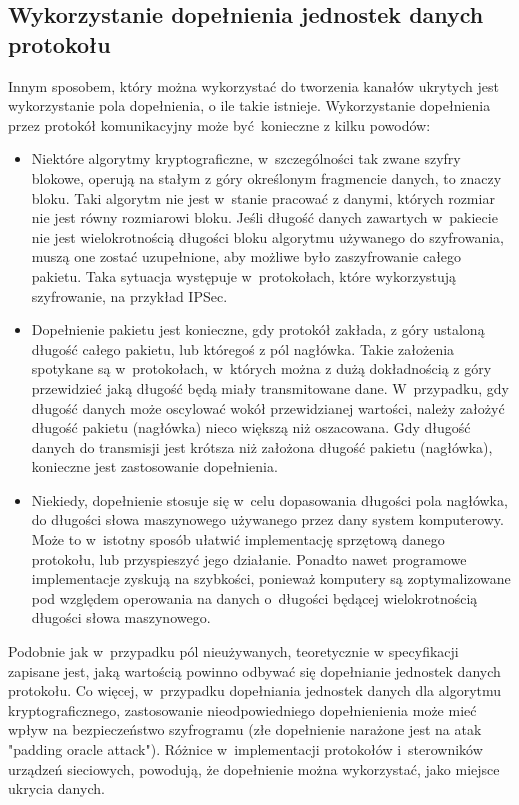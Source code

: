 \documentclass[a4paper, twoside, openright, 12pt]{report}
\begin{document}
        \subsection{Wykorzystanie dopełnienia jednostek danych protokołu}
        Innym sposobem, który można wykorzystać do tworzenia kanałów ukrytych
        jest wykorzystanie pola dopełnienia, o ile takie istnieje.
        Wykorzystanie dopełnienia przez protokół komunikacyjny
        może być konieczne z kilku powodów:
        \begin{itemize}
            \item Niektóre algorytmy kryptograficzne, w~szczególności
        tak zwane szyfry blokowe, operują na stałym z góry określonym fragmencie danych,
        to znaczy bloku. Taki algorytm nie jest w~stanie pracować z danymi, których
        rozmiar nie jest równy rozmiarowi bloku. Jeśli długość
        danych zawartych w~pakiecie nie jest wielokrotnością długości bloku
        algorytmu używanego do szyfrowania, muszą one zostać uzupełnione, aby możliwe
        było zaszyfrowanie całego pakietu. Taka sytuacja występuje w~protokołach,
        które wykorzystują szyfrowanie, na przykład IPSec\cite{IPSECPADDING}.
            \item Dopełnienie pakietu jest konieczne, gdy protokół zakłada, z góry ustaloną długość
        całego pakietu, lub któregoś z pól nagłówka. Takie założenia spotykane są
        w~protokołach, w~których można z dużą dokładnością z góry przewidzieć jaką długość
        będą miały transmitowane dane. W~przypadku, gdy długość danych może oscylować
        wokół przewidzianej wartości, należy założyć długość pakietu (nagłówka)
        nieco większą niż oszacowana. Gdy długość danych do transmisji jest krótsza niż
        założona długość pakietu (nagłówka), konieczne jest zastosowanie dopełnienia.
            \item Niekiedy, dopełnienie stosuje się w~celu dopasowania długości pola nagłówka,
        do długości słowa maszynowego używanego przez dany system komputerowy. Może
        to w~istotny sposób ułatwić implementację sprzętową danego protokołu, lub
        przyspieszyć jego działanie. Ponadto nawet programowe implementacje zyskują
        na szybkości, ponieważ komputery są zoptymalizowane pod względem operowania
        na danych o~długości będącej wielokrotnością długości słowa maszynowego.
        \end{itemize}

        Podobnie jak w~przypadku pól nieużywanych, teoretycznie w specyfikacji
        zapisane jest, jaką wartością powinno odbywać się dopełnianie jednostek danych protokołu.
        Co więcej,
        w~przypadku dopełniania jednostek danych dla algorytmu kryptograficznego, zastosowanie
        nieodpowiedniego dopełnienienia może mieć wpływ na bezpieczeństwo szyfrogramu (złe dopełnienie narażone
        jest na atak "padding oracle attack"). Różnice w~implementacji protokołów
        i~sterowników urządzeń sieciowych, powodują, że dopełnienie można wykorzystać,
        jako miejsce ukrycia danych\cite{PADSTEG}.
\end{document}
